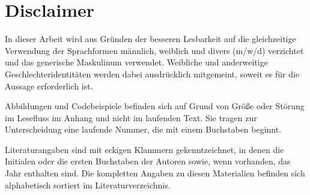 \chapter*{Disclaimer}
In dieser Arbeit wird aus Gründen der besseren Lesbarkeit auf die gleichzeitige Verwendung der Sprachformen männlich, weiblich und divers (m/w/d) verzichtet und das generische Maskulinum verwendet. Weibliche und anderweitige Geschlechteridentitäten werden dabei ausdrücklich mitgemeint, soweit es für die Aussage erforderlich ist.

\vspace{0.25cm}
Abbildungen und Codebeispiele befinden sich auf Grund von Größe oder Störung im Lesefluss im Anhang und nicht im laufenden Text. Sie tragen zur Unterscheidung eine laufende Nummer, die mit einem Buchstaben beginnt.

\vspace{0.25cm}
Literaturangaben sind mit eckigen Klammern gekenntzeichnet, in denen die Initialen oder die ersten Buchstaben der Autoren sowie, wenn vorhanden, das Jahr enthalten sind. Die kompletten Angaben zu diesen Materialien befinden sich alphabetisch sortiert im Literaturverzeichnis.